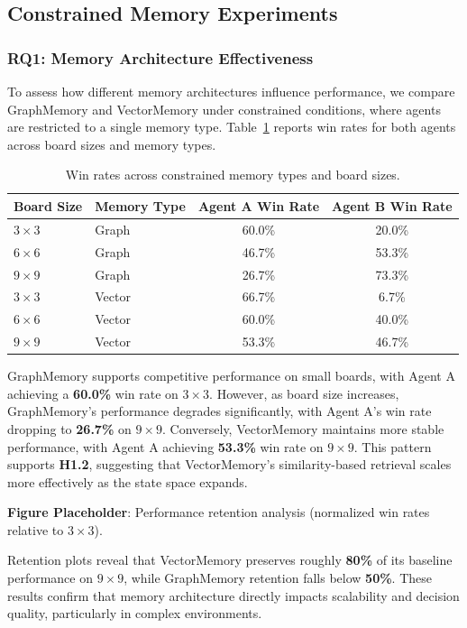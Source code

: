 \documentclass[10pt]{article}
\begin{document}
\subsection{Constrained Memory Experiments}

\subsubsection{RQ1: Memory Architecture Effectiveness}

To assess how different memory architectures influence performance, we compare GraphMemory and VectorMemory under constrained conditions, where agents are restricted to a single memory type. Table~\ref{tab:winrates} reports win rates for both agents across board sizes and memory types.

\begin{table}[h]
\centering
\small
\caption{Win rates across constrained memory types and board sizes.}
\begin{tabular}{@{}llcc@{}}
\toprule
Board Size & Memory Type & Agent A Win Rate & Agent B Win Rate \\
\midrule
$3\times3$ & Graph & 60.0\% & 20.0\% \\
$6\times6$ & Graph & 46.7\% & 53.3\% \\
$9\times9$ & Graph & 26.7\% & 73.3\% \\
\addlinespace
$3\times3$ & Vector & 66.7\% & 6.7\% \\
$6\times6$ & Vector & 60.0\% & 40.0\% \\
$9\times9$ & Vector & 53.3\% & 46.7\% \\
\bottomrule
\end{tabular}
\label{tab:winrates}
\end{table}

GraphMemory supports competitive performance on small boards, with Agent A achieving a \textbf{60.0\%} win rate on $3\times3$. However, as board size increases, GraphMemory's performance degrades significantly, with Agent A's win rate dropping to \textbf{26.7\%} on $9\times9$. Conversely, VectorMemory maintains more stable performance, with Agent A achieving \textbf{53.3\%} win rate on $9\times9$. This pattern supports \textbf{H1.2}, suggesting that VectorMemory's similarity-based retrieval scales more effectively as the state space expands.

\textbf{Figure Placeholder}: Performance retention analysis (normalized win rates relative to $3\times3$).

Retention plots reveal that VectorMemory preserves roughly \textbf{80\%} of its baseline performance on $9\times9$, while GraphMemory retention falls below \textbf{50\%}. These results confirm that memory architecture directly impacts scalability and decision quality, particularly in complex environments.
\end{document}
